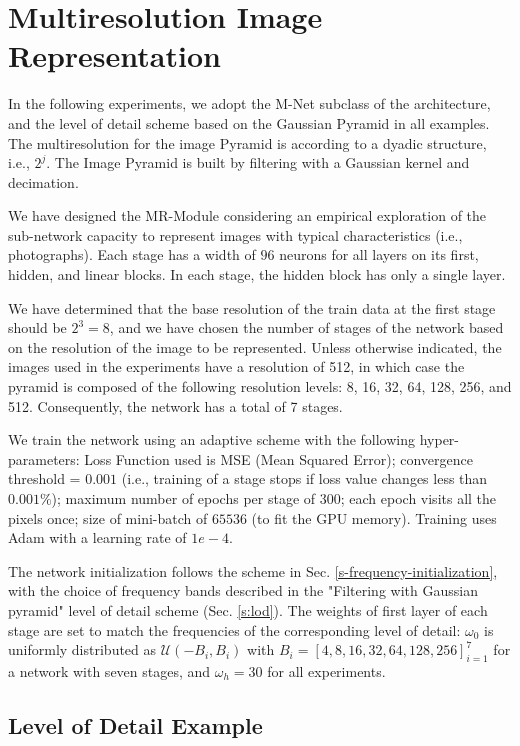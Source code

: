 \section{Multiresolution Image Representation}
\label{s:img}


In the following experiments, we adopt the M-Net subclass of the architecture, and the level of detail scheme based on the Gaussian Pyramid in all examples. The multiresolution for the image Pyramid is according to a dyadic structure, i.e., $2^j$. The Image Pyramid is built by filtering with a Gaussian kernel and decimation.

We have designed the MR-Module considering an empirical exploration of the sub-network capacity to represent images with typical characteristics (i.e., photographs). Each stage has a width of $96$ neurons for all layers on its first, hidden, and linear blocks. In each stage, the hidden block has only a single layer.

We have determined that the base resolution of the train data at the first stage should be $2^3 = 8$, and we have chosen the number of stages of the network based on the resolution of the image to be represented. Unless otherwise indicated, the images used in the experiments have a resolution of 512, in which case the pyramid is composed of the following resolution levels: 8, 16, 32, 64, 128, 256, and 512. Consequently, the network has a total of 7 stages.

We train the network using an adaptive scheme with the following hyper-parameters: Loss Function used is MSE (Mean Squared Error); convergence threshold = $0.001$ (i.e., training of a stage stops if loss value changes less than $0.001\%$); maximum number of epochs per stage of $300$; each epoch visits all the pixels once; size of mini-batch of $65536$ (to fit the GPU memory). Training uses Adam with a learning rate of $1e-4$.

The network initialization follows the scheme in Sec. \ref{s-frequency-initialization}, with the choice of frequency bands described in the "Filtering with Gaussian pyramid" level of detail scheme (Sec. \ref{s:lod}). The weights of first layer of each stage are set to match the frequencies of the corresponding level of detail: $\omega_0$ is uniformly distributed as $ \mathcal{U}(-B_i, B_i)$ with $B_i = [4, 8, 16, 32, 64, 128, 256]_{i=1}^7$ for a network with seven stages, and $\omega_h = 30$ for all experiments.


\subsection{Level of Detail Example}
\label{ss:LOD}


